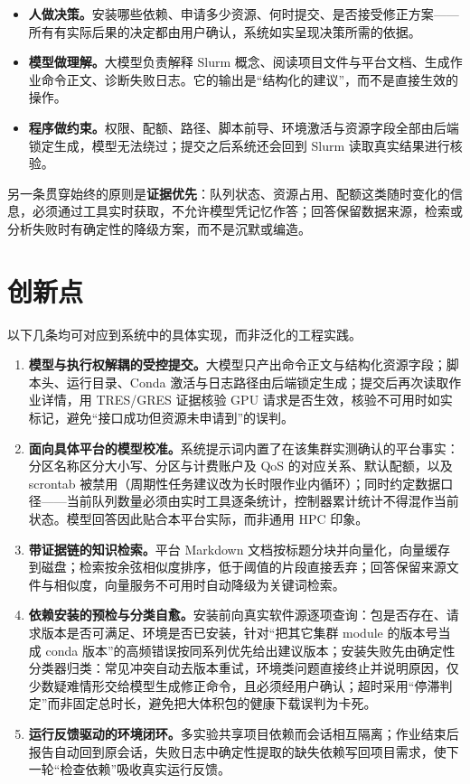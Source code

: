 \documentclass[UTF8,11pt,a4paper]{ctexart}
\begin{document}
\begin{itemize}
  \item \textbf{人做决策。}安装哪些依赖、申请多少资源、何时提交、是否接受修正方案——所有有实际后果的决定都由用户确认，系统如实呈现决策所需的依据。
  \item \textbf{模型做理解。}大模型负责解释 Slurm 概念、阅读项目文件与平台文档、生成作业命令正文、诊断失败日志。它的输出是“结构化的建议”，而不是直接生效的操作。
  \item \textbf{程序做约束。}权限、配额、路径、脚本前导、环境激活与资源字段全部由后端锁定生成，模型无法绕过；提交之后系统还会回到 Slurm 读取真实结果进行核验。
\end{itemize}

另一条贯穿始终的原则是\textbf{证据优先}：队列状态、资源占用、配额这类随时变化的信息，必须通过工具实时获取，不允许模型凭记忆作答；回答保留数据来源，检索或分析失败时有确定性的降级方案，而不是沉默或编造。

\section{创新点}
以下几条均可对应到系统中的具体实现，而非泛化的工程实践。

\begin{enumerate}
  \item \textbf{模型与执行权解耦的受控提交。}大模型只产出命令正文与结构化资源字段；脚本头、运行目录、Conda 激活与日志路径由后端锁定生成；提交后再次读取作业详情，用 TRES/GRES 证据核验 GPU 请求是否生效，核验不可用时如实标记，避免“接口成功但资源未申请到”的误判。
  \item \textbf{面向具体平台的模型校准。}系统提示词内置了在该集群实测确认的平台事实：分区名称区分大小写、分区与计费账户及 QoS 的对应关系、默认配额，以及 scrontab 被禁用（周期性任务建议改为长时限作业内循环）；同时约定数据口径——当前队列数量必须由实时工具逐条统计，控制器累计统计不得混作当前状态。模型回答因此贴合本平台实际，而非通用 HPC 印象。
  \item \textbf{带证据链的知识检索。}平台 Markdown 文档按标题分块并向量化，向量缓存到磁盘；检索按余弦相似度排序，低于阈值的片段直接丢弃；回答保留来源文件与相似度，向量服务不可用时自动降级为关键词检索。
  \item \textbf{依赖安装的预检与分类自愈。}安装前向真实软件源逐项查询：包是否存在、请求版本是否可满足、环境是否已安装，针对“把其它集群 module 的版本号当成 conda 版本”的高频错误按同系列优先给出建议版本；安装失败先由确定性分类器归类：常见冲突自动去版本重试，环境类问题直接终止并说明原因，仅少数疑难情形交给模型生成修正命令，且必须经用户确认；超时采用“停滞判定”而非固定总时长，避免把大体积包的健康下载误判为卡死。
  \item \textbf{运行反馈驱动的环境闭环。}多实验共享项目依赖而会话相互隔离；作业结束后报告自动回到原会话，失败日志中确定性提取的缺失依赖写回项目需求，使下一轮“检查依赖”吸收真实运行反馈。
\end{enumerate}
\end{document}
